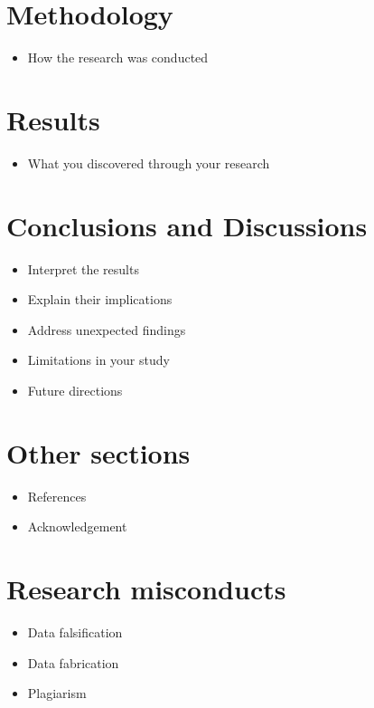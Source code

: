 \documentclass[
  letterpaper,
  DIV=11,
  numbers=noendperiod]{scrreprt}
\providecommand{\tightlist}{%
  \setlength{\itemsep}{0pt}\setlength{\parskip}{0pt}}\usepackage{longtable,booktabs,array}
\begin{document}
\section{Methodology}\label{methodology}

\begin{itemize}
\tightlist
\item
  How the research was conducted
\end{itemize}

\section{Results}\label{results}

\begin{itemize}
\tightlist
\item
  What you discovered through your research
\end{itemize}

\section{Conclusions and Discussions}\label{conclusions-and-discussions}

\begin{itemize}
\item
  Interpret the results
\item
  Explain their implications
\item
  Address unexpected findings
\item
  Limitations in your study
\item
  Future directions
\end{itemize}

\section{Other sections}\label{other-sections}

\begin{itemize}
\item
  References
\item
  Acknowledgement
\end{itemize}

\section{Research misconducts}\label{research-misconducts}

\begin{itemize}
\item
  Data falsification
\item
  Data fabrication
\item
  Plagiarism
\end{itemize}
\end{document}
